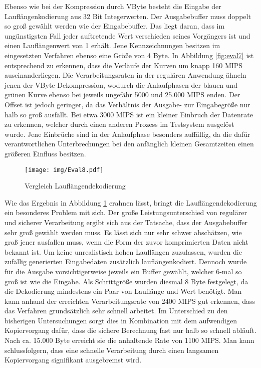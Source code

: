 Ebenso wie bei der Kompression durch VByte besteht die Eingabe der Lauflängenkodierung aus 32 Bit Integerwerten. Der Ausgabebuffer muss doppelt so groß gewählt werden wie der Eingabebuffer. Das liegt daran, dass im ungünstigsten Fall jeder auftretende Wert verschieden seines Vorgängers ist und einen Lauflängenwert von 1 erhält. Jene Kennzeichnungen besitzen im eingesetzten Verfahren ebenso eine Größe von 4 Byte. In Abbildung \ref{fig:eval7} ist entsprechend zu erkennen, dass die Verläufe der Kurven um knapp 160 \ac{MIPS} auseinanderliegen. Die Verarbeitungsraten in der regulären Anwendung ähneln jenen der VByte Dekompression, wodurch die Anlaufphasen der blauen und grünen Kurve ebenso bei jeweils ungefähr 5000 und 25.000 \ac{MIPS} enden. Der Offset ist jedoch geringer, da das Verhältnis der Ausgabe- zur Eingabegröße nur halb so groß ausfällt. Bei etwa 3000 \ac{MIPS} ist ein kleiner Einbruch der Datenrate zu erkennen, welcher durch einen anderen Prozess im Testsystem ausgelöst wurde. Jene Einbrüche sind in der Anlaufphase besonders auffällig, da die dafür verantwortlichen Unterbrechungen bei den anfänglich kleinen Gesamtzeiten einen größeren Einfluss besitzen.

\begin{figure}[H]
	\texttt{[image: img/Eval8.pdf]}
	\centering
	\caption{Vergleich Lauflängendekodierung}
	\label{fig:eval8}
\end{figure}

Wie das Ergebnis in Abbildung \ref{fig:eval8} erahnen lässt, bringt die Lauflängendekodierung ein besonderes Problem mit sich. Der große Leistungsunterschied von regulärer und sicherer Verarbeitung ergibt sich aus der Tatsache, dass der Ausgabebuffer sehr groß gewählt werden muss. Es lässt sich nur sehr schwer abschätzen, wie groß jener ausfallen muss, wenn die Form der zuvor komprimierten Daten nicht bekannt ist. Um keine unrealistisch hohen Lauflängen zuzulassen, wurden die zufällig generierten Eingabedaten zusätzlich lauflängenkodiert. Dennoch wurde für die Ausgabe vorsichtigerweise jeweils ein Buffer gewählt, welcher 6-mal so groß ist wie die Eingabe. Als Schrittgröße wurden diesmal 8 Byte festgelegt, da die Dekodierung mindestens ein Paar von Lauflänge und Wert benötigt. Man kann anhand der erreichten Verarbeitungsrate von 2400 \ac{MIPS} gut erkennen, dass das Verfahren grundsätzlich sehr schnell arbeitet. Im Unterschied zu den bisherigen Untersuchungen sorgt dies in Kombination mit dem aufwendigen Kopiervorgang dafür, dass die sichere Berechnung fast nur halb so schnell abläuft. Nach ca. 15.000 Byte erreicht sie die anhaltende Rate von 1100 \ac{MIPS}. Man kann schlussfolgern, dass eine schnelle Verarbeitung durch einen langsamen Kopiervorgang signifikant ausgebremst wird.

